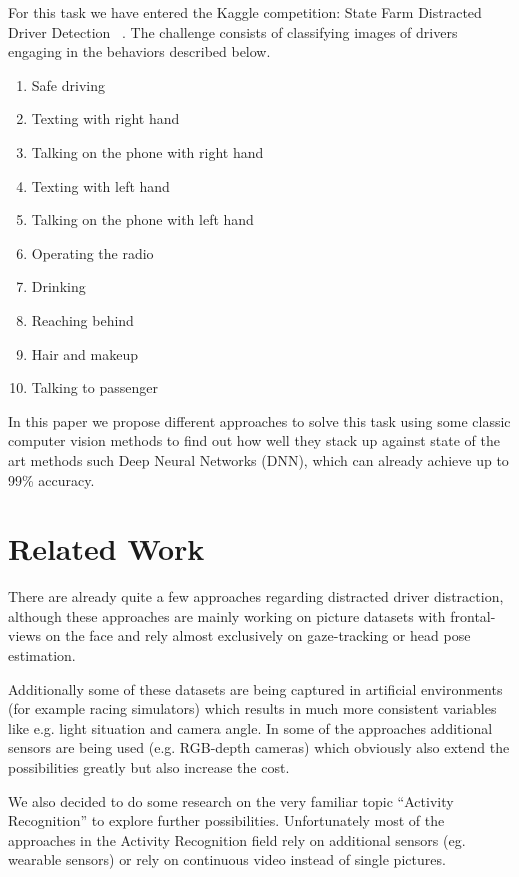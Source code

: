 \documentclass[10pt,twocolumn,letterpaper]{article}
\begin{document}
For this task we have entered the Kaggle competition: State Farm Distracted Driver Detection ~\cite{Kaggle}. The challenge consists of classifying images of drivers engaging in the behaviors described below.

\begin{enumerate}
	\item Safe driving
	\item Texting with right hand
	\item Talking on the phone with right hand
	\item Texting with left hand
	\item Talking on the phone with left hand
	\item Operating the radio
	\item Drinking
	\item Reaching behind
	\item Hair and makeup
	\item Talking to passenger
\end{enumerate}

In this paper we propose different approaches to solve this task using some classic computer vision methods to find out how well they stack up against state of the art methods such Deep Neural Networks (DNN), which can already achieve up to 99\% accuracy.



\section{Related Work}

There are already quite a few approaches regarding distracted driver distraction, although these approaches are mainly working on picture datasets with frontal-views on the face and rely almost exclusively on gaze-tracking or head pose estimation. \cite{Dorazio} \cite{6957817}

Additionally some of these datasets are being captured in artificial environments (for example racing simulators) \cite{itsc:bergasa2008} which results in much more consistent variables like e.g. light situation and camera angle. In some of the approaches additional sensors are being used (e.g. RGB-depth cameras) which obviously also extend the possibilities greatly but also increase the cost. \cite{Ragab2014}

We also decided to do some research on the very familiar topic ``Activity Recognition'' to explore further possibilities. Unfortunately most of the approaches in the Activity Recognition field rely on additional sensors (eg. wearable sensors) \cite{6258525} \cite{6365160} or rely on continuous video instead of single pictures. \cite{1315249} \cite{1430826}
\end{document}
